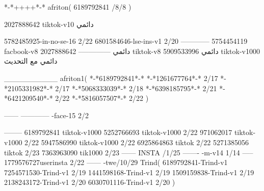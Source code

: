 *-*++++*-*
afriton(
6189792841 /8/8
)

2027888642 tiktok-v10
دائمي

5782485925-in-no-se-16 2/22
6801584646-lse-ins-v1 2/20
------------
5754454119 facbook-v8
دائمي
--------------
2027888642 tiktok-v8
دائمي
5909533996 tiktok-v1000
دائمي مع التحديث

__________
afriton1(
*-*6189792841*-*
*-*1261677764*-* 2/17
*-*2105331982*-* 2/17
*-*5068333039*-* 2/18
*-*6398185795*-* 2/21
*-*6421209540*-* 2/22
*-*5816057507*-* 2/22
)

------
------------
-face-15 2/2

--------
6189792841 tiktok-v1000
5252766693 tiktok-v1000 2/22
971062017 tiktok-v1000 2/22
5947586990 tiktok-v1000 2/22
6925864863 tiktok 2/22
5271385056 tiktok 2/23
7363963090 tik1000 2/23
------
 INSTA /1/25
-------
-m-v14 1/14
-----
1779576727userinsta 2/22
------
-twe/10/29
Trind(
6189792841-Trind-v1 
7254571530-Trind-v1 2/19
1441598168-Trind-v1 2/19
1509159838-Trind-v1 2/19
2138243172-Trind-v1 2/20
6030701116-Trind-v1 2/20
)
